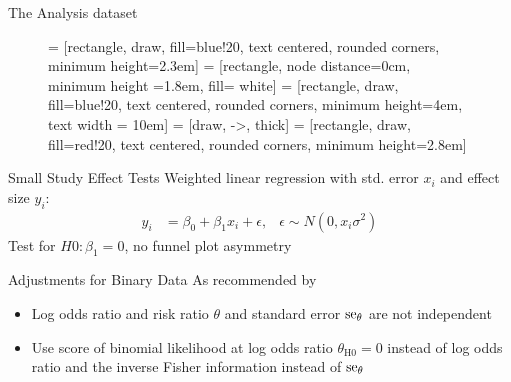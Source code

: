 \documentclass[english]{beamer}\usepackage[]{graphicx}\usepackage[]{color}
\begin{document}
\begin{frame}{The Analysis dataset}
\footnotesize
\begin{figure}
\begin{center}
 = [rectangle, draw, fill=blue!20, text centered, rounded corners, minimum height=2.3em]
 = [rectangle, node distance=0cm, minimum height =1.8em, fill= white]
 = [rectangle, draw, fill=blue!20, text centered, rounded corners, minimum height=4em, text width = 10em]
 = [draw, ->, thick]
 = [rectangle, draw, fill=red!20, text centered, rounded corners, minimum height=2.8em]


\end{center}
\end{figure}
\end{frame}


\begin{frame}{Small Study Effect Tests}
\vspace{-4mm}
Weighted linear regression with std. error $x_i$ and effect size $y_i$:
\begin{align}
y_i &= \beta_0 + \beta_1 x_i + \epsilon, & \epsilon \sim N(0, x_i \sigma^2) \nonumber
\end{align}
Test for $H0: \beta_1 = 0$, no funnel plot asymmetry
\end{frame}

\begin{frame}{Adjustments for Binary Data}
As recommended by \citet{Sterne}
\begin{itemize}
\item Log odds ratio and risk ratio $\theta$ and standard error $\operatorname{se}_\theta$ are not independent
\item Use score of binomial likelihood at log odds ratio $\theta_{\textrm{H0}} = 0$ instead of 
log odds ratio and the inverse Fisher information instead of $\operatorname{se}_\theta$
\end{itemize}
\end{frame}
\end{document}
